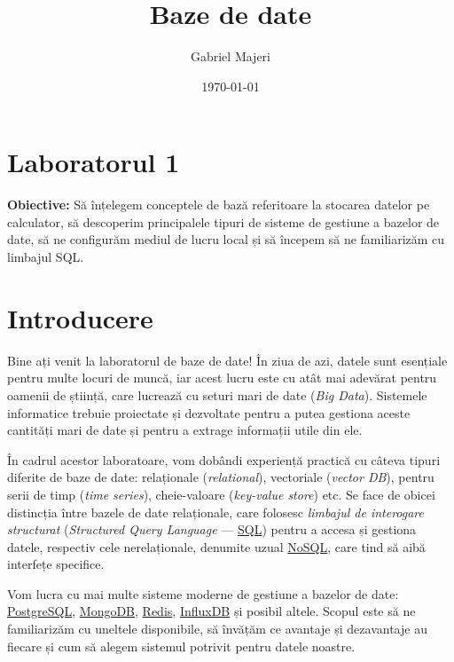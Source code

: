 \documentclass[a4paper, 12pt]{article}
\title{Baze de date}
\author{Gabriel Majeri}
\date{\today}
\begin{document}

\pagestyle{fancy}

\fancyhead{}

\section*{Laboratorul 1}

\textbf{Obiective:} Să înțelegem conceptele de bază referitoare la stocarea datelor pe calculator, să descoperim principalele tipuri de sisteme de gestiune a bazelor de date, să ne configurăm mediul de lucru local și să începem să ne familiarizăm cu limbajul SQL.

\section{Introducere}

Bine ați venit la laboratorul de baze de date! În ziua de azi, datele sunt esențiale pentru multe locuri de muncă, iar acest lucru este cu atât mai adevărat pentru oamenii de știință, care lucrează cu seturi mari de date (\textit{Big Data}). Sistemele informatice trebuie proiectate și dezvoltate pentru a putea gestiona aceste cantități mari de date și pentru a extrage informații utile din ele.

În cadrul acestor laboratoare, vom dobândi experiență practică cu câteva tipuri diferite de baze de date: relaționale (\textit{relational}), vectoriale (\textit{vector DB}), pentru serii de timp (\textit{time series}), cheie-valoare (\textit{key-value store}) etc. Se face de obicei distincția între bazele de date relaționale, care folosesc \emph{limbajul de interogare structurat} (\textit{Structured Query Language} --- \href{https://en.wikipedia.org/wiki/SQL}{SQL}) pentru a accesa și gestiona datele, respectiv cele nerelaționale, denumite uzual \href{https://en.wikipedia.org/wiki/NoSQL}{NoSQL}, care tind să aibă interfețe specifice.

Vom lucra cu mai multe sisteme moderne de gestiune a bazelor de date: \href{https://www.postgresql.org/}{PostgreSQL}, \href{https://www.mongodb.com/}{MongoDB}, \href{https://redis.io/}{Redis}, \href{https://www.influxdata.com/}{InfluxDB} și posibil altele. Scopul este să ne familiarizăm cu uneltele disponibile, să învățăm ce avantaje și dezavantaje au fiecare și cum să alegem sistemul potrivit pentru datele noastre.
\end{document}
